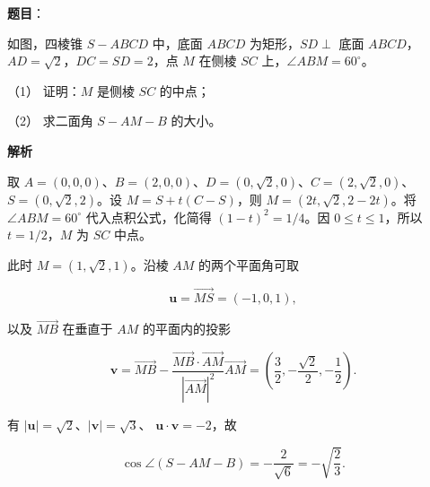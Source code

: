 \begin{answer}

\textbf{题目}：

如图，四棱锥 $S-ABCD$ 中，底面 $ABCD$ 为矩形，$SD\perp$ 底面 $ABCD$，$AD=\sqrt2$，$DC=SD=2$，点 $M$ 在侧棱 $SC$ 上，$\angle ABM=60^\circ$。
\nopagebreak[4]
\begin{center}\end{center}
\nopagebreak[4]
（1） 证明：$M$ 是侧棱 $SC$ 的中点；

（2） 求二面角 $S-AM-B$ 的大小。

\textbf{解析}


取
$A=(0,0,0)$、$B=(2,0,0)$、$D=(0,\sqrt2,0)$、$C=(2,\sqrt2,0)$、
$S=(0,\sqrt2,2)$。设 $M=S+t(C-S)$，则
$M=(2t,\sqrt2,2-2t)$。将 $\angle ABM=60^\circ$ 代入点积公式，化简得
$(1-t)^2=1/4$。因 $0\leqslant t\leqslant1$，所以 $t=1/2$，$M$ 为
$SC$ 中点。


此时 $M=(1,\sqrt2,1)$。沿棱 $AM$ 的两个平面角可取

\nopagebreak[4]
\[
\boldsymbol u=\overrightarrow{MS}=(-1,0,1),
\]

以及 $\overrightarrow{MB}$ 在垂直于 $AM$ 的平面内的投影

\nopagebreak[4]
\[
\boldsymbol v=\overrightarrow{MB}
-\frac{\overrightarrow{MB}\cdot\overrightarrow{AM}}
{|\overrightarrow{AM}|^2}\overrightarrow{AM}
=\left(\frac32,-\frac{\sqrt2}{2},-\frac12\right).
\]

有 $|\boldsymbol u|=\sqrt2$、$|\boldsymbol v|=\sqrt3$、
$\boldsymbol u\cdot\boldsymbol v=-2$，故

\nopagebreak[4]
\[
\cos\angle(S-AM-B)=-\frac2{\sqrt6}=-\sqrt{\frac23}.
\]



\end{answer}
